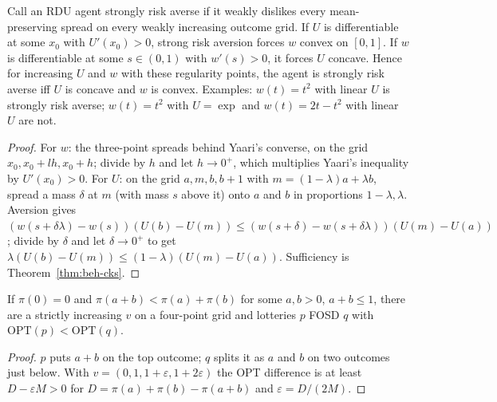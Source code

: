 \begin{theorem}
\label{thm:beh-cks-iff}
\leanok
Call an RDU agent strongly risk averse if it weakly dislikes every mean-preserving spread on every weakly increasing
outcome grid. If $U$ is differentiable at some $x_0$ with $U'(x_0)>0$, strong risk aversion forces $w$ convex on $[0,1]$.
If $w$ is differentiable at some $s\in(0,1)$ with $w'(s)>0$, it forces $U$ concave. Hence for increasing $U$ and $w$
with these regularity points, the agent is strongly risk averse iff $U$ is concave and $w$ is convex. Examples: $w(t)=t^2$
with linear $U$ is strongly risk averse; $w(t)=t^2$ with $U=\exp$ and $w(t)=2t-t^2$ with linear $U$ are not.
\end{theorem}
\begin{proof}
\leanok
For $w$: the three-point spreads behind Yaari's converse, on the grid $x_0,x_0+lh,x_0+h$; divide by $h$ and let
$h\to0^+$, which multiplies Yaari's inequality by $U'(x_0)>0$. For $U$: on the grid $a,m,b,b+1$ with $m=(1-\lambda)a+\lambda b$,
spread a mass $\delta$ at $m$ (with mass $s$ above it) onto $a$ and $b$ in proportions $1-\lambda,\lambda$. Aversion gives
$(w(s+\delta\lambda)-w(s))(U(b)-U(m))\le(w(s+\delta)-w(s+\delta\lambda))(U(m)-U(a))$; divide by $\delta$ and let $\delta\to0^+$ to get
$\lambda(U(b)-U(m))\le(1-\lambda)(U(m)-U(a))$. Sufficiency is Theorem~\ref{thm:beh-cks}.
\end{proof}

\begin{theorem}
\label{thm:beh-opt}
\leanok
{}
If $\pi(0)=0$ and $\pi(a+b)<\pi(a)+\pi(b)$ for some $a,b>0$, $a+b\le1$, there are a strictly increasing $v$ on a
four-point grid and lotteries $p$ FOSD $q$ with $\mathrm{OPT}(p)<\mathrm{OPT}(q)$.
\end{theorem}
\begin{proof}
\leanok
$p$ puts $a+b$ on the top outcome; $q$ splits it as $a$ and $b$ on two outcomes just below. With $v=(0,1,1+\varepsilon,1+2\varepsilon)$
the OPT difference is at least $D-\varepsilon M>0$ for $D=\pi(a)+\pi(b)-\pi(a+b)$ and $\varepsilon=D/(2M)$.
\end{proof}

